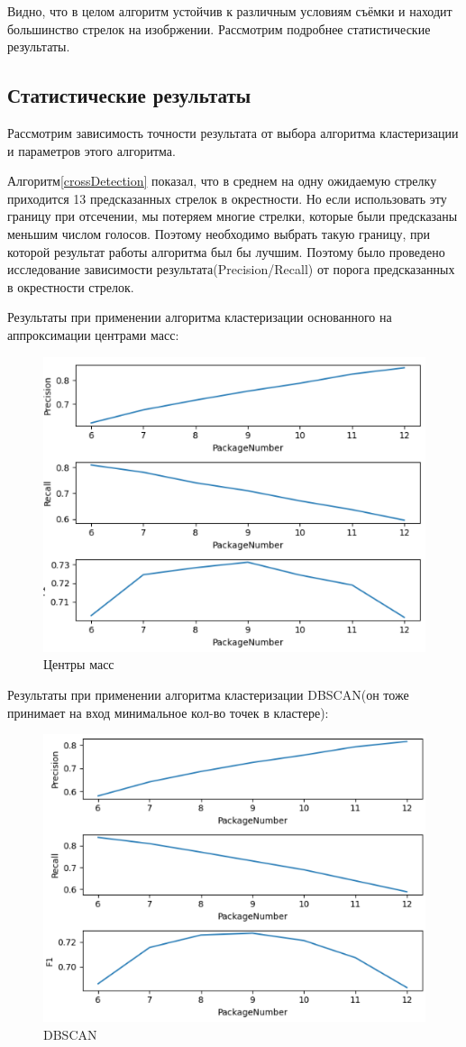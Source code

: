 Видно, что в целом алгоритм устойчив к различным условиям съёмки и находит большинство стрелок на изобржении. Рассмотрим подробнее статистические результаты.

\subsection{Статистические результаты}
\label{statRes}
Рассмотрим зависимость точности результата от выбора алгоритма кластеризации и параметров этого алгоритма. 

Алгоритм\ref{crossDetection} показал, что в среднем на одну ожидаемую стрелку приходится 13 предсказанных стрелок в окрестности. Но если использовать эту границу при отсечении, мы потеряем многие стрелки, которые были предсказаны меньшим числом голосов. Поэтому необходимо выбрать такую границу, при которой результат работы алгоритма был бы лучшим.
Поэтому было проведено исследование зависимости результата(Precision/Recall) от порога предсказанных в окрестности стрелок.

Результаты при применении алгоритма кластеризации основанного на аппроксимации центрами масс:
\begin{figure}[h!]
	\centering
	\includegraphics[width=0.7\linewidth]{pictures/screenshot224}
	\caption{Центры масс}
	\label{fig:screenshot224}
\end{figure}
\newpage
Результаты при применении алгоритма кластеризации DBSCAN\cite{b:dbscan}(он тоже принимает на вход минимальное кол-во точек в кластере):
\begin{figure}[h!]
	\centering
	\includegraphics[width=0.7\linewidth]{pictures/screenshot223}
	\caption{DBSCAN}
	\label{fig:screenshot223}
\end{figure}

